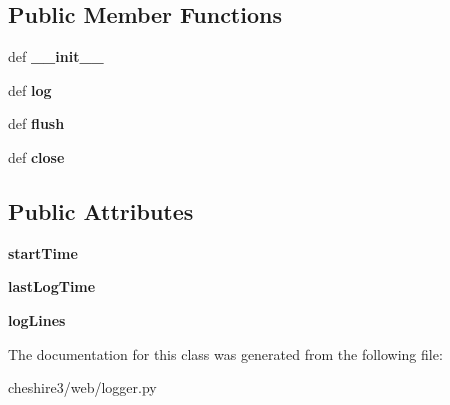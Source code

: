 \subsection*{Public Member Functions}
\begin{DoxyCompactItemize}
\item 
\hypertarget{classcheshire3_1_1web_1_1logger_1_1_single_transaction_logger_aacdafee73bf5bddfe70714ce9c9f14dd}{def {\bfseries \-\_\-\-\_\-init\-\_\-\-\_\-}}\label{classcheshire3_1_1web_1_1logger_1_1_single_transaction_logger_aacdafee73bf5bddfe70714ce9c9f14dd}

\item 
\hypertarget{classcheshire3_1_1web_1_1logger_1_1_single_transaction_logger_a89edb7700437622ab9c5f6c80a365361}{def {\bfseries log}}\label{classcheshire3_1_1web_1_1logger_1_1_single_transaction_logger_a89edb7700437622ab9c5f6c80a365361}

\item 
\hypertarget{classcheshire3_1_1web_1_1logger_1_1_single_transaction_logger_a123e78d9228e9d7104bb49f813193e5a}{def {\bfseries flush}}\label{classcheshire3_1_1web_1_1logger_1_1_single_transaction_logger_a123e78d9228e9d7104bb49f813193e5a}

\item 
\hypertarget{classcheshire3_1_1web_1_1logger_1_1_single_transaction_logger_a3663d594f164dab5e6c71960cc1405c5}{def {\bfseries close}}\label{classcheshire3_1_1web_1_1logger_1_1_single_transaction_logger_a3663d594f164dab5e6c71960cc1405c5}

\end{DoxyCompactItemize}
\subsection*{Public Attributes}
\begin{DoxyCompactItemize}
\item 
\hypertarget{classcheshire3_1_1web_1_1logger_1_1_single_transaction_logger_a78c035a7fd44425f1eb034cb2dcb77aa}{{\bfseries start\-Time}}\label{classcheshire3_1_1web_1_1logger_1_1_single_transaction_logger_a78c035a7fd44425f1eb034cb2dcb77aa}

\item 
\hypertarget{classcheshire3_1_1web_1_1logger_1_1_single_transaction_logger_a6c313a480eeccc5af7b281fe14c393c8}{{\bfseries last\-Log\-Time}}\label{classcheshire3_1_1web_1_1logger_1_1_single_transaction_logger_a6c313a480eeccc5af7b281fe14c393c8}

\item 
\hypertarget{classcheshire3_1_1web_1_1logger_1_1_single_transaction_logger_a50285433c04b6474a3d932cff17aced9}{{\bfseries log\-Lines}}\label{classcheshire3_1_1web_1_1logger_1_1_single_transaction_logger_a50285433c04b6474a3d932cff17aced9}

\end{DoxyCompactItemize}


The documentation for this class was generated from the following file\-:\begin{DoxyCompactItemize}
\item 
cheshire3/web/logger.\-py\end{DoxyCompactItemize}
